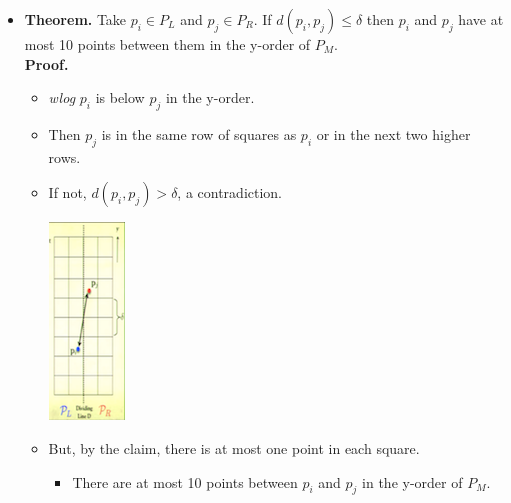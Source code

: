 \documentclass[12pt]{article}
\begin{document}
\begin{itemize}
\item \textbf{Theorem.} Take $p_i \in P_L$ and $p_j \in P_R$. If $d(p_i, p_j) \leq \delta$ then $p_i$ and $p_j$ have at most 10 points between them in the y-order of $P_M$.\\
\textbf{Proof.}
	\begin{itemize}
	\item \textit{wlog} $p_i$ is below $p_j$ in the y-order.
	\item Then $p_j$ is in the same row of squares as $p_i$ or in the next two higher rows.
	\item If not, $d(p_i, p_j) > \delta$, a contradiction.
	\begin{center}
	\includegraphics{lecture611}
	\end{center}
	\item But, by the claim, there is at most one point in each square.
		\begin{itemize}
		\item There are at most 10 points between $p_i$ and $p_j$ in the y-order of $P_M$.
		\end{itemize} 
	\end{itemize} 
\end{itemize}	
	
\end{document}
